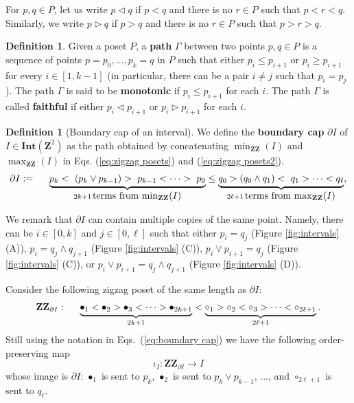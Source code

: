 \documentclass[11pt]{article}
\theoremstyle{definition}
\newtheorem{definition}[theorem]{Definition}
\newcommand{\ZZ}{\mathbf{ZZ}}
\newcommand{\overmax}{\max_{\ZZ} (I)}
\newcommand{\overmin}{\min_{\ZZ} (I)}
\newcommand{\Int}{\mathbf{Int}}
\newcommand{\Pb}{P}
\newcommand{\Z}{\mathbf{Z}}
\begin{document}
For $p,q\in \Pb$, let us write $p\triangleleft q$ if $p<q$ and there is no $r\in \Pb$ such that $p<r<q$. Similarly, we write $p\triangleright q$ if $p>q$ and there is no $r\in \Pb$ such that $p>r>q$.

\begin{definition}\label{def:path}
Given a poset $\Pb$, a \textbf{path} $\Gamma$ between two points $p,q\in \Pb$ is a sequence
of points $p=p_0,\ldots, p_k=q$ in $\Pb$ such that either $p_i\leq p_{i+1}$ or
$p_i\geq p_{i+1}$ for every $i\in [1,k-1]$ (in particular, there can be a pair $i\neq j$ such that $p_i=p_j$). The path $\Gamma$ is said to be \textbf{monotonic} if $p_i\leq p_{i+1}$ for each $i$. The path $\Gamma$ is called \textbf{faithful} if either $p_i\triangleleft p_{i+1}$ or
$p_i\triangleright p_{i+1}$ for each $i$.
\end{definition}

\begin{definition}[Boundary cap of an interval]\label{def:boundary cap} We define the \textbf{boundary cap} $\partial I$ of $I\in \Int(\Z^2)$ as the path obtained by concatenating $\min_{\ZZ}(I)$ and $\max_{\ZZ}(I)$ in Eqs. (\ref{eq:zigzag posets}) and (\ref{eq:zigzag posets2}). %
\begin{equation}\label{eq:boundary cap}
    \partial I:=\hspace{5mm}\underbrace{p_k<\ (p_{k}\vee p_{k-1})>\ p_{k-1}<\cdots >\ p_0}_{2k+1\,\mbox{terms from $\overmin$}}\leq \underbrace{q_0> (q_0\wedge q_1)<\  q_1>\cdots< q_\ell}_{2\ell+1\,\mbox{terms from $\overmax$}},
\end{equation}
\end{definition}
We remark that $\partial I$ can contain multiple copies of the same point. Namely, there can be $i\in [0,k]$ and $j\in [0,\ell]$ such that either $p_i=q_j$ (Figure \ref{fig:intervals} (A)), $p_i=q_j\wedge q_{j+1}$ (Figure \ref{fig:intervals} (C)), $p_i\vee p_{i+1}=q_j$ (Figure \ref{fig:intervals} (C)), or $p_i\vee p_{i+1}=q_{j}\wedge q_{j+1}$ (Figure \ref{fig:intervals} (D)). 

Consider the following zigzag poset of the same length as $\partial I$: 
\begin{equation}\label{eq:ZZ partial I}
    \ZZ_{\partial I}:\hspace{5mm} \underbrace{\bullet_{1}<\bullet_{2}>\bullet_{3}<\cdots>\bullet_{2k+1}}_{2k+1}< \underbrace{\circ
_{1}>\circ_2<\circ_3>\cdots<\circ_{2\ell+1}}_{2\ell+1}.
\end{equation}
Still using the notation in Eqs.~(\ref{eq:boundary cap}) we have the  following order-preserving map 
\begin{equation}\label{eq:iotaI}
    \iota_I:\ZZ_{\partial I}\rightarrow I
\end{equation} whose image is $\partial I$: $\bullet_1$ is sent to $p_k$, $\bullet_2$ is sent to $p_k\vee p_{k-1}$, $\ldots$, and $\circ_{2\ell+1}$ is sent to $q_\ell$. 
\end{document}
